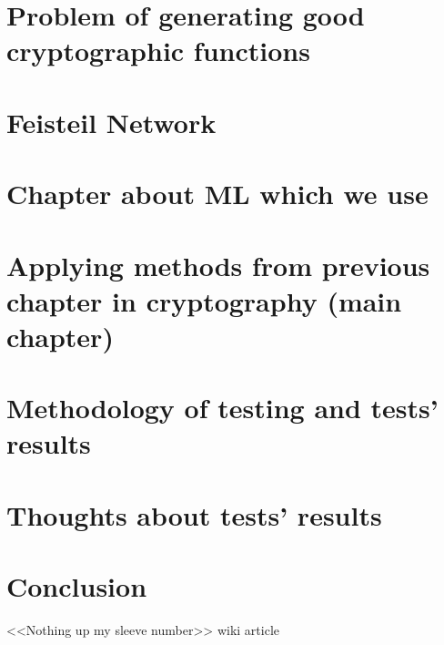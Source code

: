 \documentclass[a4paper,onecolumn,twoside,12pt]{article}
\begin{document}
\section{Problem of generating good cryptographic functions}

\section{Feisteil Network}

\section{Chapter about ML which we use}

\section{Applying methods from previous chapter in cryptography (main chapter)}

\section{Methodology of testing and tests' results}

\section{Thoughts about tests' results}

\section{Conclusion}

\begin{thebibliography}{3}
	 <<Nothing up my sleeve number>> wiki article
\end{thebibliography}
\end{document}
